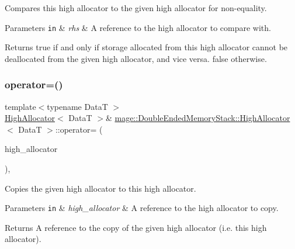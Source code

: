 Compares this high allocator to the given high allocator for non-\/equality.


\begin{DoxyParams}[1]{Parameters}
\mbox{\tt in}  & {\em rhs} & A reference to the high allocator to compare with. \\
\hline
\end{DoxyParams}
\begin{DoxyReturn}{Returns}
{\ttfamily true} if and only if storage allocated from this high allocator cannot be deallocated from the given high allocator, and vice versa. {\ttfamily false} otherwise. 
\end{DoxyReturn}
\hypertarget{structmage_1_1_double_ended_memory_stack_1_1_high_allocator_a98575ee1722ef7a4f1193922bba417f8}{}\label{structmage_1_1_double_ended_memory_stack_1_1_high_allocator_a98575ee1722ef7a4f1193922bba417f8} 
\subsubsection{\texorpdfstring{operator=()}{operator=()}\hspace{0.1cm}{\footnotesize\ttfamily [1/2]}}
{\footnotesize\ttfamily template$<$typename DataT $>$ \\
\hyperlink{structmage_1_1_double_ended_memory_stack_1_1_high_allocator}{High\+Allocator}$<$ DataT $>$\& \hyperlink{structmage_1_1_double_ended_memory_stack_1_1_high_allocator}{mage\+::\+Double\+Ended\+Memory\+Stack\+::\+High\+Allocator}$<$ DataT $>$\+::operator= (\begin{DoxyParamCaption}\item[{const \hyperlink{structmage_1_1_double_ended_memory_stack_1_1_high_allocator}{High\+Allocator}$<$ DataT $>$ \&}]{high\+\_\+allocator }\end{DoxyParamCaption})\hspace{0.3cm}{\ttfamily [delete]}, {\ttfamily [noexcept]}}

Copies the given high allocator to this high allocator.


\begin{DoxyParams}[1]{Parameters}
\mbox{\tt in}  & {\em high\+\_\+allocator} & A reference to the high allocator to copy. \\
\hline
\end{DoxyParams}
\begin{DoxyReturn}{Returns}
A reference to the copy of the given high allocator (i.\+e. this high allocator). 
\end{DoxyReturn}
\hypertarget{structmage_1_1_double_ended_memory_stack_1_1_high_allocator_af4660cee754955e0b5149595c541b1a7}{}\label{structmage_1_1_double_ended_memory_stack_1_1_high_allocator_af4660cee754955e0b5149595c541b1a7} 
